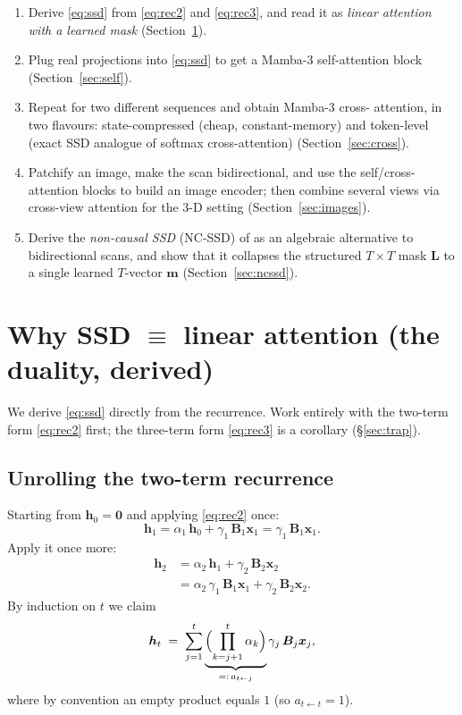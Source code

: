 \documentclass[11pt,a4paper]{article}
\begin{document}
\begin{enumerate}
  \item Derive \eqref{eq:ssd} from \eqref{eq:rec2} and
        \eqref{eq:rec3}, and read it as \emph{linear attention with a
        learned mask} (Section~\ref{sec:ssd}).
  \item Plug real projections into \eqref{eq:ssd} to get a Mamba-3
        self-attention block (Section~\ref{sec:self}).
  \item Repeat for two different sequences and obtain Mamba-3 cross-
        attention, in two flavours: state-compressed (cheap,
        constant-memory) and token-level (exact SSD analogue of
        softmax cross-attention) (Section~\ref{sec:cross}).
  \item Patchify an image, make the scan bidirectional, and use the
        self/cross-attention blocks to build an image encoder; then
        combine several views via cross-view attention for the 3-D
        setting (Section~\ref{sec:images}).
  \item Derive the \emph{non-causal SSD} (NC-SSD) of \cite{vssd}
        as an algebraic alternative to bidirectional scans, and show
        that it collapses the structured $T\times T$ mask $\bm{L}$ to
        a single learned $T$-vector $\bm{m}$
        (Section~\ref{sec:ncssd}).
\end{enumerate}

\section{Why SSD $\equiv$ linear attention (the duality, derived)}
\label{sec:ssd}

We derive \eqref{eq:ssd} directly from the recurrence. Work entirely
with the two-term form \eqref{eq:rec2} first; the three-term form
\eqref{eq:rec3} is a corollary (\S\ref{sec:trap}).

\subsection{Unrolling the two-term recurrence}

Starting from $\bm{h}_0 = \bm{0}$ and applying \eqref{eq:rec2} once:
\begin{equation}\label{eq:un1}
  \bm{h}_1 = \alpha_1\,\bm{h}_0 + \gamma_1\,\bm{B}_1\bm{x}_1
           = \gamma_1\,\bm{B}_1\bm{x}_1.
\end{equation}
Apply it once more:
\begin{align}
  \bm{h}_2 &= \alpha_2\,\bm{h}_1 + \gamma_2\,\bm{B}_2\bm{x}_2 \nonumber \\
           &= \alpha_2\,\gamma_1\,\bm{B}_1\bm{x}_1
             + \gamma_2\,\bm{B}_2\bm{x}_2. \label{eq:un2}
\end{align}
By induction on $t$ we claim
\begin{equation}\label{eq:un-claim}
  \bm{h}_t \;=\; \sum_{j=1}^{t}
     \underbrace{\Bigl(\prod_{k=j+1}^{t}\alpha_k\Bigr)}_{=:\,a_{t\leftarrow j}}
     \gamma_j\,\bm{B}_j\bm{x}_j,
\end{equation}
where by convention an empty product equals $1$ (so
$a_{t\leftarrow t} = 1$).
\end{document}
